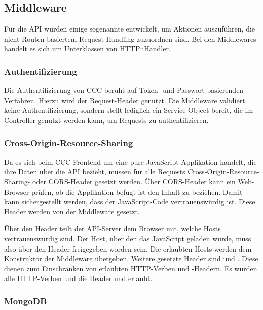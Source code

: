 \subsection{Middleware}
\label{ssec:ba_middleware}

Für die API wurden einige sogenannte  entwickelt, um
Aktionen auszuführen, die nicht Routen-basiertem Request-Handling zuzuordnen
sind.  Bei den Middlewares handelt es sich um Unterklassen von HTTP::Handler.

\subsubsection{Authentifizierung}
\label{sssec:bam_authentifizierung}

Die Authentifizierung von CCC beruht auf Token- und Passwort-basierenden
Verfahren.  Hierzu wird der Request-Header  genutzt.  Die
Middleware  validiert keine Authentifizierung, sondern stellt
lediglich ein Service-Object  bereit, die im Controller
genutzt werden kann, um Requests zu authentifizieren.

\subsubsection{Cross-Origin-Resource-Sharing}
\label{sssec:bam_cors}

Da es sich beim CCC-Frontend um eine pure JavaScript-Applikation handelt, die
ihre Daten über die API bezieht, müssen für alle Requests
Cross-Origin-Resource-Sharing- oder CORS-Header gesetzt werden. Über
CORS-Header kann ein Web-Browser prüfen, ob die Applikation befugt ist den
Inhalt zu beziehen.  Damit kann sichergestellt werden, dass der JavaScript-Code
vertrauenswürdig ist.  Diese Header werden von der Middleware 
gesetzt.

Über den Header  teilt der API-Server dem
Browser mit, welche Hosts vertrauenswürdig sind.  Der Host, über den
das JavaScript geladen wurde, muss also über den Header freigegeben worden
sein.  Die erlaubten Hosts werden dem Konstruktor der Middleware übergeben.
Weitere gesetzte Header sind  und
.  Diese dienen zum Einschränken von
erlaubten HTTP-Verben und -Headern.  Es wurden alle HTTP-Verben und die Header
 und  erlaubt.

\subsubsection{MongoDB}
\label{sssec:bam_mongodb}

